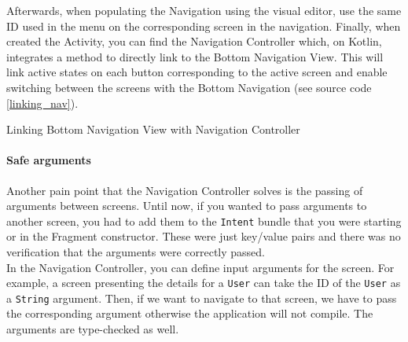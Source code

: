 \documentclass[twoside, openright,11pt,a4paper]{book}
\newenvironment{code}{\captionsetup{type=listing}}{}
\begin{document}
Afterwards, when populating the Navigation using the visual editor, use the same ID used in the menu on the corresponding screen in the navigation. Finally, when created the Activity, you can find the Navigation Controller which, on Kotlin, integrates a method to directly link to the Bottom Navigation View. This will link active states on each button corresponding to the active screen and enable switching between the screens with the Bottom Navigation (see source code \ref{linking_nav}).

\begin{code}
	\caption{Linking Bottom Navigation View with Navigation Controller}
	\label{linking_nav}
\end{code}
\paragraph{Safe arguments}
Another pain point that the Navigation Controller solves is the passing of arguments between screens. Until now, if you wanted to pass arguments to another screen, you had to add them to the \verb+Intent+ bundle that you were starting or in the Fragment constructor. These were just key/value pairs and there was no verification that the arguments were correctly passed.\\

In the Navigation Controller, you can define input arguments for the screen. For example, a screen presenting the details for a \verb+User+ can take the ID of the \verb+User+ as a \verb+String+ argument. Then, if we want to navigate to that screen, we have to pass the corresponding argument otherwise the application will not compile. The arguments are type-checked as well. \\
\end{document}
